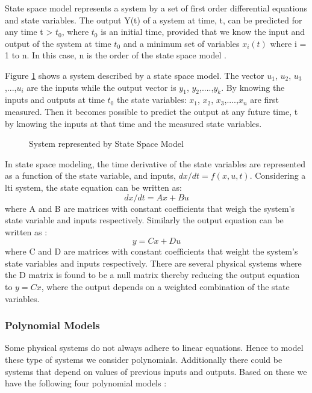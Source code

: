 \documentclass[article,type=msc,colorback,12pt,accentcolor=tud8b,table]{tudthesis}
\begin{document}
State space model represents a system by a set of first order differential equations and state variables. The output Y(t) of a system at time, t, can be predicted for any time t > $t_0$,  where $t_0$ is an initial time, provided that we know the input and output of the system at time $t_0$ and a minimum set of variables $x_i(t)$ where i = 1 to n. In this case, n is the order of the state space model \cite{ljung1987system}. 

Figure \ref{fig:state_space_model} shows a system described by a state space model. The vector $u_1$, $u_2$, $u_3$,...,$u_i$ are the inputs while the output vector is $y_1$, $y_2$,....,$y_k$. By knowing the inputs and outputs at time $t_0$ the state variables: $x_1$, $x_2$, $x_3$,....,$x_n$ are first measured. Then it becomes possible to predict the output at any future time, t by knowing the inputs at that time and the measured state variables.

 \begin{figure}
 \begin{center}
  \makebox[\textwidth]{\texttt{[image: B6]}}
\end{center}
\caption{System represented by State Space Model}
\label{fig:state_space_model}
\end{figure}

In state space modeling, the time derivative of the state variables are represented as a function of the state variable, and inputs, $dx/dt = f(x,u,t)$. Considering a \gls{lti} system, the state equation can be written as\cite{ljung1987system}: $$ dx/dt = Ax + Bu $$ where A and B are matrices with constant coefficients that weigh the system's state variable and inputs respectively. Similarly the output equation can be written as \cite{ljung1987system}: $$ y = Cx + Du $$ where C and D are matrices with constant coefficients that weight the system's state variables and inputs respectively. There are several physical systems where the D matrix is found to be a null matrix thereby reducing the output equation to $ y = Cx $, where the output depends on a weighted combination of the state variables.

\subsubsection{Polynomial Models}
	
	Some physical systems do not always adhere to linear equations. Hence to model these type of systems we consider polynomials. Additionally there could be systems that depend on values of previous inputs and outputs. Based on these we have the following four polynomial models \cite{ljung1998system, ljung1999system}:
	
\end{document}
